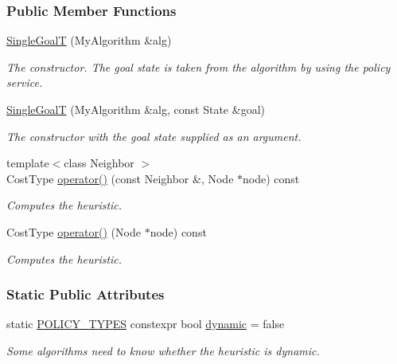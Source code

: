 \subsubsection*{Public Member Functions}
\begin{DoxyCompactItemize}
\item 
\hyperlink{structslb_1_1ext_1_1policy_1_1heuristic_1_1SingleGoalT_a901de1d8bd04cf1f2bbb0099c4c33b3e}{Single\+GoalT} (My\+Algorithm \&alg)
\begin{DoxyCompactList}\small\item\em The constructor. The goal state is taken from the algorithm by using the policy service. \end{DoxyCompactList}\item 
\hyperlink{structslb_1_1ext_1_1policy_1_1heuristic_1_1SingleGoalT_a109419aa94dffc9359b338acb06bba8d}{Single\+GoalT} (My\+Algorithm \&alg, const State \&goal)
\begin{DoxyCompactList}\small\item\em The constructor with the goal state supplied as an argument. \end{DoxyCompactList}\item 
{\footnotesize template$<$class Neighbor $>$ }\\Cost\+Type \hyperlink{structslb_1_1ext_1_1policy_1_1heuristic_1_1SingleGoalT_a9a5a37acd02a84a619ac27ce1142b8c2}{operator()} (const Neighbor \&, Node $\ast$node) const 
\begin{DoxyCompactList}\small\item\em Computes the heuristic. \end{DoxyCompactList}\item 
Cost\+Type \hyperlink{structslb_1_1ext_1_1policy_1_1heuristic_1_1SingleGoalT_aa77977fc0c95f3fc79a9c35c9f2c5179}{operator()} (Node $\ast$node) const 
\begin{DoxyCompactList}\small\item\em Computes the heuristic. \end{DoxyCompactList}\end{DoxyCompactItemize}
\subsubsection*{Static Public Attributes}
\begin{DoxyCompactItemize}
\item 
static \hyperlink{extensions_2shared__policies_2headers_8h_ae70a06fa4631780beea14971eb36a562}{P\+O\+L\+I\+C\+Y\+\_\+\+T\+Y\+P\+ES} constexpr bool \hyperlink{structslb_1_1ext_1_1policy_1_1heuristic_1_1SingleGoalT_a798cb33aef57532d3b1cdc83afa8965a}{dynamic} = false\hypertarget{structslb_1_1ext_1_1policy_1_1heuristic_1_1SingleGoalT_a798cb33aef57532d3b1cdc83afa8965a}{}\label{structslb_1_1ext_1_1policy_1_1heuristic_1_1SingleGoalT_a798cb33aef57532d3b1cdc83afa8965a}

\begin{DoxyCompactList}\small\item\em Some algorithms need to know whether the heuristic is dynamic. \end{DoxyCompactList}\end{DoxyCompactItemize}

